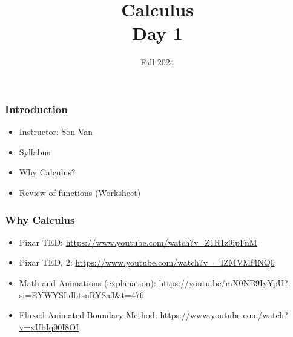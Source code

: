 \documentclass[aspectratio=169]{beamer}
\title{ Calculus  \\ Day 1 }
\date{Fall 2024}
\begin{document}
\maketitle


\begin{frame}
	\frametitle{Introduction}
	\begin{itemize}
		\item Instructor: Son Van
		\item Syllabus
		\item Why Calculus?
		\item Review of functions (Worksheet)
	\end{itemize}
\end{frame}

\begin{frame}
	\frametitle{Why Calculus}
	\begin{itemize}
		\item Pixar TED: \url{https://www.youtube.com/watch?v=Z1R1z9ipFnM}
		\item Pixar TED, 2: \url{https://www.youtube.com/watch?v=_IZMVMf4NQ0}
		\item Math and Animations (explanation): \url{https://youtu.be/mX0NB9IyYpU?si=EYWYSLdbtsnRYSaJ&t=476}
		\item Fluxed Animated Boundary Method: \url{https://www.youtube.com/watch?v=xUbIq90I8OI}
	\end{itemize}


\end{frame}
\end{document}

